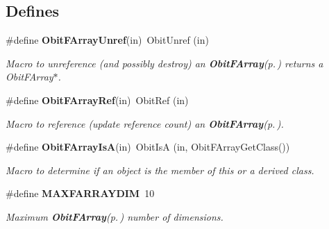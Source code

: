 \subsection*{Defines}
\begin{CompactItemize}
\item 
\#define {\bf Obit\-FArray\-Unref}(in)\ Obit\-Unref (in)
\begin{CompactList}\small\item\em Macro to unreference (and possibly destroy) an {\bf Obit\-FArray}{\rm (p.\,\pageref{structObitFArray})} returns a Obit\-FArray$\ast$. \item\end{CompactList}\item 
\#define {\bf Obit\-FArray\-Ref}(in)\ Obit\-Ref (in)
\begin{CompactList}\small\item\em Macro to reference (update reference count) an {\bf Obit\-FArray}{\rm (p.\,\pageref{structObitFArray})}. \item\end{CompactList}\item 
\#define {\bf Obit\-FArray\-Is\-A}(in)\ Obit\-Is\-A (in, Obit\-FArray\-Get\-Class())
\begin{CompactList}\small\item\em Macro to determine if an object is the member of this or a derived class. \item\end{CompactList}\item 
\#define {\bf MAXFARRAYDIM}\ 10
\begin{CompactList}\small\item\em Maximum {\bf Obit\-FArray}{\rm (p.\,\pageref{structObitFArray})} number of dimensions. \item\end{CompactList}\end{CompactItemize}
